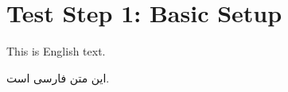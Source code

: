 \documentclass[12pt,a4paper]{article}
\begin{document}
\section*{Test Step 1: Basic Setup}

This is English text.

\textfarsi{این متن فارسی است.}
\end{document}
